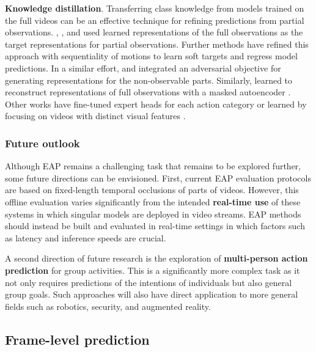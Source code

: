 \noindent
\textbf{Knowledge distillation}. Transferring class knowledge \citep{park2019relational} from models trained on the full videos can be an effective technique for refining predictions from partial observations. \citet{cai2019action}, \citet{fernando2021anticipating}, and \citet{wang2019progressive} used learned representations of the full observations as the target representations for partial observations. Further methods \citep{hou2020confidence} have refined this approach with sequentiality of motions to learn soft targets and regress model predictions. In a similar effort, \citep{xu2019prediction} and \citep{zheng2023egocentric} integrated an adversarial objective for generating representations for the non-observable parts. Similarly, \citet{xu2023dynamic} learned to reconstruct representations of full observations with a masked autoencoder \citep{he2022masked}. Other works have fine-tuned expert heads for each action category \citep{foo2022era} or learned by focusing on videos with distinct visual features \citep{hu2018early}.


\subsubsection{Future outlook}

Although EAP remains a challenging task that remains to be explored further, some future directions can be envisioned. First, current EAP evaluation protocols are based on fixed-length temporal occlusions of parts of videos. However, this offline evaluation varies significantly from the intended \textbf{real-time use} of these systems in which singular models are deployed in video streams. EAP methods should instead be built and evaluated in real-time settings in which factors such as latency and inference speeds are crucial.

A second direction of future research is the exploration of \textbf{multi-person action prediction} for group activities. This is a significantly more complex task as it not only requires predictions of the intentions of individuals but also general group goals. Such approaches will also have direct application to more general fields such as robotics, security, and augmented reality. 







\subsection{Frame-level prediction}
\label{sec:prediction::VFP}

